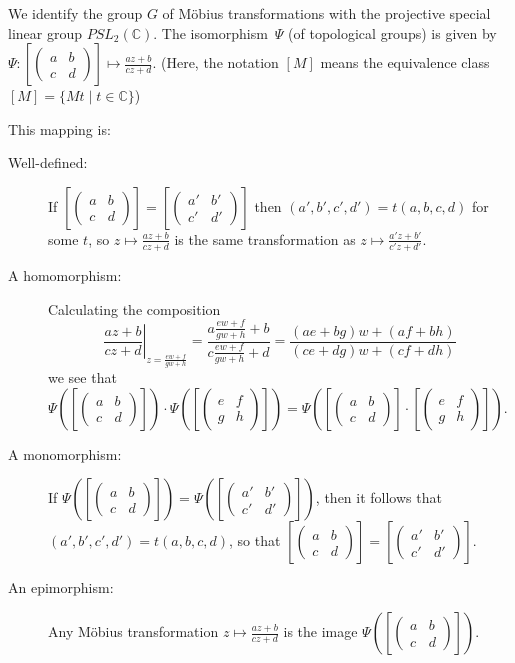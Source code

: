 \documentclass[12pt]{article}
\newcommand{\smfour}[4]
{
  {
    \left(
      \begin{smallmatrix}
      {#1}&{#2}\\
      {#3}&{#4}
      \end{smallmatrix}
    \right)
  }
}
\newcommand{\mobius}[5]{{\frac{#2#1+#3}{#4#1+#5}}}
\begin{document}

We identify the group $G$ of M\"obius transformations with the projective special linear group $PSL_2(\mathbb{C})$.  The isomorphism~$\Psi$ (of topological groups) is given by $\Psi: \left[\smfour{a}{b}{c}{d}\right] \mapsto \mobius{z}{a}{b}{c}{d}$.  (Here, the notation $[M]$ means the equivalence class $[M] = \{ Mt \mid t \in \mathbb{C} \}$)

This mapping is:
\begin{description}

\item[Well-defined:]
If $\left[\smfour{a}{b}{c}{d}\right]=\left[\smfour{a'}{b'}{c'}{d'}\right]$
then $(a',b',c',d')=t(a,b,c,d)$ for some $t$, so $z\mapsto\mobius{z}{a}{b}{c}{d}$ is the same transformation as $z\mapsto\mobius{z}{a'}{b'}{c'}{d'}$.

\item[A homomorphism:]
Calculating the composition
\[
\left.\mobius{z}{a}{b}{c}{d}\right|_{z=\mobius{w}{e}{f}{g}{h}} =
\frac{a\mobius{w}{e}{f}{g}{h}+b}{c\mobius{w}{e}{f}{g}{h}+d} =
\frac{(ae+bg)w+(af+bh)}{(ce+dg)w+(cf+dh)}
\]
we see that $\Psi\left(\left[\smfour{a}{b}{c}{d}\right]\right)\cdot \Psi\left(\left[\smfour{e}{f}{g}{h}\right]\right) =
\Psi\left(\left[\smfour{a}{b}{c}{d}\right]\cdot
\left[\smfour{e}{f}{g}{h}\right]\right)$.

\item[A monomorphism:]
If $\Psi\left(\left[\smfour{a}{b}{c}{d}\right]\right)=
\Psi\left(\left[\smfour{a'}{b'}{c'}{d'}\right]\right)$, then it follows that $(a',b',c',d')=t(a,b,c,d)$,
so that
$\left[\smfour{a}{b}{c}{d}\right]=
\left[\smfour{a'}{b'}{c'}{d'}\right]$.

\item[An epimorphism:]
Any M\"obius transformation $z\mapsto\mobius{z}{a}{b}{c}{d}$ is the image $\Psi\left(\left[\smfour{a}{b}{c}{d}\right]\right)$.

\end{description}
\end{document}
